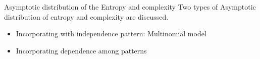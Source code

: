 \documentclass{beamer}
\begin{document}


\begin{frame}{Asymptotic distribution of the Entropy and complexity}
	Two types of Asymptotic distribution of entropy and complexity are discussed.
	\begin{itemize}
		\item Incorporating with independence pattern: Multinomial model 
		\item Incorporating dependence among patterns
	\end{itemize}
\end{frame}

\end{document}
